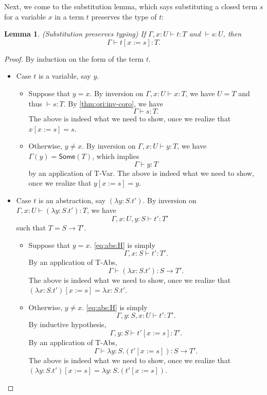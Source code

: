\documentclass[11pt]{article}
\newtheorem{lemma}{Lemma}
\let\to\rightarrow
\newcommand{\Some}[1]{\textsf{Some}(#1)}
\begin{document}
Next, we come to the substitution lemma, which says substituting a closed term $s$ for a variable $x$ in a term $t$ preserves the type of $t$:
\begin{lemma}\label{thm:ori:subst}
    (Substitution preserves typing) If $\Gamma,x:U \vdash t:T$ and $\vdash s:U$, then $$\Gamma \vdash t[x:=s]:T.$$
\end{lemma}
\begin{proof}
    By induction on the form of the term $t$.
    \begin{itemize}
        \item Case $t$ is a variable, say $y$.
        \begin{itemize}
            \item Suppose that $y=x$. By inversion on $\Gamma,x:U \vdash x:T$, we have $U=T$ and thus $\vdash s:T$.
            By \cref{thm:ori:inv-coro}, we have
            $$\Gamma \vdash s:T.$$
            The above is indeed what we need to show, once we realize that $x[x:=s]=s$.
            \item Otherwise, $y\not=x$.
            By inversion on $\Gamma,x:U \vdash y:T$, we have $\Gamma(y)=\Some{T}$, which implies
            $$\Gamma \vdash y:T$$
            by an application of T-Var.
            The above is indeed what we need to show, once we realize that $y[x:=s]=y$.
        \end{itemize}
        \item Case $t$ is an abstraction, say $(\lambda y:S.t')$.
        By inversion on $\Gamma,x:U \vdash (\lambda y:S.t'):T$, we have
        \begin{equation}\label{eq:abs:H}
            \Gamma,x:U,y:S \vdash t':T'
        \end{equation}
        such that $T=S \to T'$.
        \begin{itemize}
            \item Suppose that $y=x$. \cref{eq:abs:H} is simply
            $$\Gamma,x:S \vdash t':T'.$$
            By an application of T-Abs, $$\Gamma \vdash (\lambda x:S.t'):S \to T'.$$
            The above is indeed what we need to show, once we realize that $(\lambda x:S.t')[x:=s]=\lambda x:S.t'$.
            \item Otherwise, $y\not=x$. \cref{eq:abs:H} is simply
            $$\Gamma,y:S,x:U \vdash t':T'.$$
            By inductive hypothesis, $$\Gamma,y:S \vdash t'[x:=s]:T'.$$
            By an application of T-Abs, $$\Gamma \vdash \lambda y:S.(t'[x:=s]):S \to T'.$$
            The above is indeed what we need to show, once we realize that $(\lambda y:S.t')[x:=s]=\lambda y:S.(t'[x:=s])$.

\end{itemize}
\end{itemize}
\end{proof}
\end{document}
